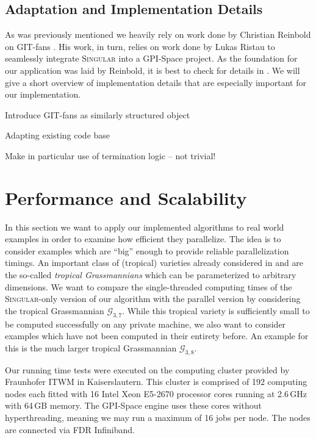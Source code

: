 \documentclass[
  paper=a4,
  titlepage,
  bibliography=totoc,
  listof=totoc,
  pagesize=pdftex
]{scrartcl}
\numberwithin{figure}{section}
\numberwithin{equation}{section}
\numberwithin{table}{section}
\theoremstyle{definition}
\numberwithin{definition}{section}
\begin{document}

\subsection{Adaptation and Implementation Details}

As was previously mentioned we heavily rely on work done by Christian Reinbold on GIT-fans
\cite{reinboldGitFan}. His work, in turn, relies on work done by Lukas Ristau to
seamlessly integrate \textsc{Singular} into a GPI-Space project. As the foundation for our
application was laid by Reinbold, it is best to check for details in
\cite[Section~4]{reinboldGitFan}. We will give a short overview of implementation details
that are especially important for our implementation.

Introduce GIT-fans as similarly structured object

Adapting existing code base

Make in particular use of termination logic -- not trivial!

\section{Performance and Scalability}

In this section we want to apply our implemented algorithms to real world examples in
order to examine how efficient they parallelize. The idea is to consider examples which
are \enquote{big} enough to provide reliable parallelization timings. An important class
of (tropical) varieties already considered in \cite{tropPointsLinks} and \cite{tropGrass}
are the so-called \emph{tropical Grassmannians} which can be parameterized to arbitrary
dimensions. We want to compare the single-threaded computing times of the
\textsc{Singular}-only version of our algorithm with the parallel version by considering
the tropical Grassmannian $\mathcal G_{3,7}$. While this tropical variety is sufficiently
small to be computed successfully on any private machine, we also want to consider
examples which have not been computed in their entirety before. An example for this is the
much larger tropical Grassmannian $\mathcal G_{3,8}$.

Our running time tests were executed on the computing cluster provided by Fraunhofer ITWM
in Kaiserslautern. This cluster is comprised of 192 computing nodes each fitted with 16
Intel Xeon E5-2670 processor cores running at 2.6\,GHz with 64\,GB memory. The GPI-Space
engine uses these cores without hyperthreading, meaning we may run a maximum of 16 jobs
per node. The nodes are connected via FDR Infiniband.
\end{document}
